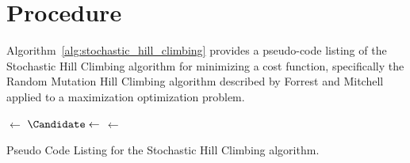 \documentclass[a4paper, 11pt]{article}
\begin{document}
\section{Procedure}
\label{sec:procedure}
Algorithm~\ref{alg:stochastic_hill_climbing} provides a pseudo-code listing of the Stochastic Hill Climbing algorithm for minimizing a cost function, specifically the Random Mutation Hill Climbing algorithm described by Forrest and Mitchell \cite{Forrest1993} applied to a maximization optimization problem.

\begin{algorithm}[htp]
	\SetLine
	\KwIn{\NumIterations, \ProblemSize}
	\KwOut{\Current}
	\Current $\leftarrow$ \RandomSolution{\ProblemSize}\;
	 {
		$\Candidate \leftarrow$ \RandomNeighbor{\Current}\;		
		\If{\Cost{\Candidate} $\geq$ \Cost{\Current}} {
			\Current $\leftarrow$ \Candidate\;
		}
	}
	\Return{\Current}\;
	\caption{Pseudo Code Listing for the Stochastic Hill Climbing algorithm.}
	\label{alg:stochastic_hill_climbing}
\end{algorithm}

\end{document}
